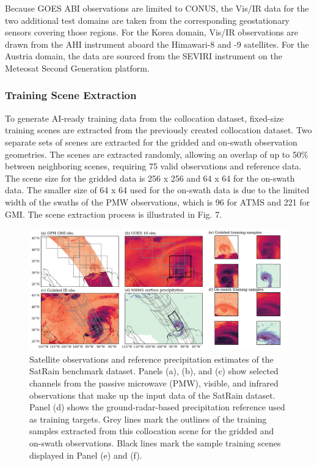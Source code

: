\documentclass[11pt]{article}
\begin{document}
Because GOES ABI observations are limited to CONUS, the Vis/IR data for the two
additional test domains are taken from the corresponding geostationary sensors
covering those regions. For the Korea domain, Vis/IR observations are drawn from
the AHI instrument aboard the Himawari-8 and -9 satellites. For the Austria
domain, the data are sourced from the SEVIRI instrument on the Meteosat Second
Generation platform.

\subsubsection{Training Scene Extraction}


To generate AI-ready training data from the collocation dataset, fixed-size
training scenes are extracted from the previously created collocation dataset.
Two separate sets of scenes are extracted for the gridded and on-swath
observation geometries. The scenes are extracted randomly, allowing an overlap
of up to 50\% between neighboring scenes, requiring 75%
valid observations and reference data. The scene size for the gridded data is
256 x 256 and 64 x 64 for the on-swath data. The smaller size of 64 x 64 used
for the on-swath data is due to the limited width of the swaths of the PMW
observations, which is 96 for ATMS and 221 for GMI. The scene extraction process
is illustrated in Fig. 7.


\begin{figure}[htbp] %
	\centering
	\includegraphics[width=1.0\textwidth]{figures/fig08}
	\caption{
		Satellite observations and reference precipitation estimates of the SatRain
		benchmark dataset. Panels (a), (b), and (c) show selected channels from the
		passive microwave (PMW), visible, and infrared observations that make up the
		input data of the SatRain dataset. Panel (d) shows the ground-radar-based
		precipitation reference used as training targets. Grey lines mark the outlines
		of the training samples extracted from this collocation scene for the gridded
		and on-swath observations. Black lines mark the sample training scenes displayed
		in Panel (e) and (f).
	}
	\label{fig:observations_geo}
\end{figure}
\end{document}
